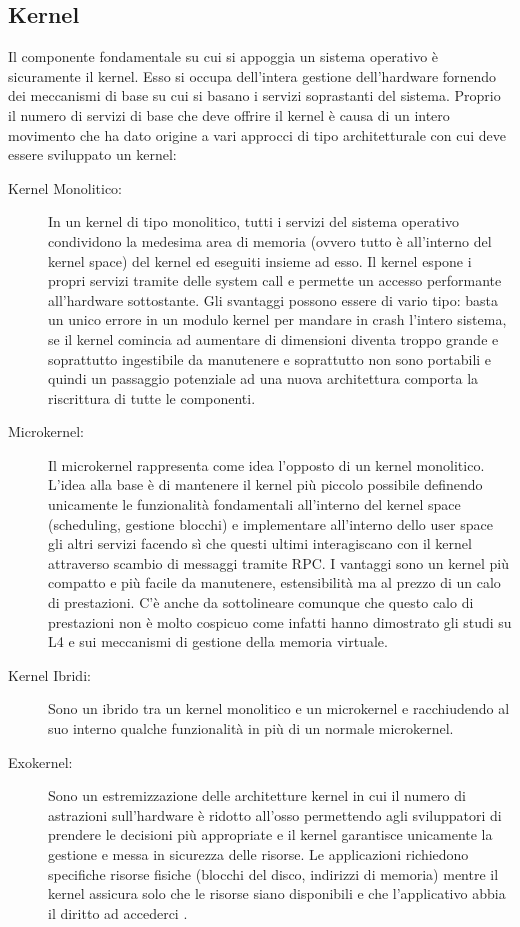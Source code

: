 \subsection{Kernel}
Il componente fondamentale su cui si appoggia un sistema operativo è sicuramente il kernel. Esso si occupa dell'intera gestione dell'hardware fornendo dei meccanismi di base su cui si basano i servizi soprastanti del sistema. Proprio il numero di servizi di base che deve offrire il kernel è causa di un intero movimento che ha dato origine a vari approcci di tipo architetturale con cui deve essere sviluppato un kernel:
\begin{description}
  \item[Kernel Monolitico:] In un kernel di tipo monolitico, tutti i servizi del sistema operativo condividono la medesima area di memoria (ovvero tutto è all'interno del kernel space) del kernel ed eseguiti insieme ad esso. Il kernel espone i propri servizi tramite delle system call e permette un accesso performante all'hardware sottostante. Gli svantaggi possono essere di vario tipo: basta un unico errore in un modulo kernel per mandare in crash l'intero sistema, se il kernel comincia ad aumentare di dimensioni diventa troppo grande e soprattutto ingestibile da manutenere e soprattutto non sono portabili e quindi un passaggio potenziale ad una nuova architettura comporta la riscrittura di tutte le componenti.
  \item[Microkernel:] Il microkernel rappresenta come idea l'opposto di un kernel monolitico. L'idea alla base è di mantenere il kernel più piccolo possibile definendo unicamente le funzionalità fondamentali all'interno del kernel space (scheduling, gestione blocchi) e implementare all'interno dello user space gli altri servizi facendo sì che questi ultimi  interagiscano con il kernel attraverso scambio di messaggi tramite RPC. I vantaggi sono un kernel più compatto e più facile da manutenere, estensibilità ma al prezzo di un calo di prestazioni. C'è anche da sottolineare comunque che questo calo di prestazioni non è molto cospicuo come infatti hanno dimostrato gli studi su L4\cite{hartig97} e sui meccanismi di gestione della memoria virtuale\cite{rashid88,appel91}.
  \item[Kernel Ibridi:] Sono un ibrido tra un kernel monolitico e un microkernel e racchiudendo al suo interno qualche funzionalità in più di un normale microkernel.
  \item[Exokernel:] Sono un estremizzazione delle architetture kernel in cui il numero di astrazioni sull'hardware è ridotto all'osso permettendo agli sviluppatori di prendere le decisioni più appropriate e il kernel garantisce unicamente la gestione e messa in sicurezza delle risorse. Le applicazioni richiedono specifiche risorse fisiche (blocchi del disco, indirizzi di memoria) mentre il kernel assicura solo che le risorse siano disponibili e che l'applicativo abbia il diritto ad accederci \cite{engler94}.
\end{description}
